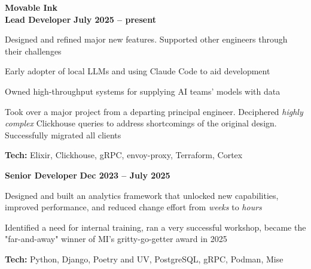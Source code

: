 \documentclass[margin,line]{resume}
\begin{document}
\begin{resume}
    \hspace{-3mm}\textbf{\listing Movable Ink} \vspace{2mm}\\\vspace{1mm}
    \hspace{1.2mm}\textbf{Lead Developer} \hfill \textbf{July 2025 -- present}\vspace{1mm}
    \begin{list2}
        \item Designed and refined major new features. Supported other engineers through their challenges
        \vspace{1mm}
        \item Early adopter of local LLMs and using Claude Code to aid development
        \vspace{1mm}
        \item Owned high-throughput systems for supplying AI teams' models with data
        \vspace{1mm}
        \item Took over a major project from a departing principal engineer. Deciphered \textit{highly complex} Clickhouse queries to address shortcomings of the original design. Successfully migrated all clients
        \vspace{1mm}
        \item\textbf{Tech:} Elixir, Clickhouse, gRPC, envoy-proxy, Terraform, Cortex
    \end{list2}


    \hspace{2.6mm}\textbf{Senior Developer} \hfill \textbf{Dec 2023 -- July 2025}\vspace{1mm}
    \begin{list2}
        \item Designed and built an analytics framework that unlocked new capabilities, improved performance, and reduced change effort from \textit{weeks} to \textit{hours}
        \vspace{1mm}
        \item Identified a need for internal training, ran a very successful workshop, became the "far-and-away" winner of MI's gritty-go-getter award in 2025
        \vspace{1mm}
        \item\textbf{Tech:} Python, Django, Poetry and UV, PostgreSQL, gRPC, Podman, Mise
    \end{list2}




\end{resume}
\end{document}
